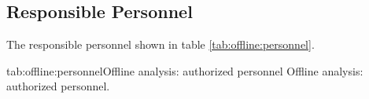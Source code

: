 \infolevfour {


%



} %

\begin{safetyen}{10}{15}
\subsection{Responsible  Personnel} 
\end{safetyen}
The responsible personnel shown in table \ref{tab:offline:personnel}.
\begin{namestab}{tab:offline:personnel}{Offline analysis: 
authorized personnel}{%
      Offline analysis: authorized personnel.}
  \RobertMichaels{}
  \AlexandreCamsonne{}
\end{namestab}
 
%
%
%
%
%
%
%

